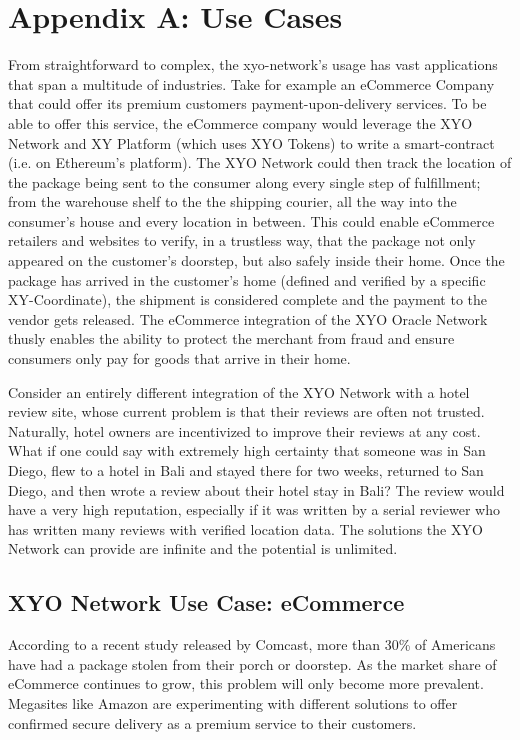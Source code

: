 \documentclass{article}
\begin{document}
\section{Appendix A: Use Cases}
From straightforward to complex, the \Gls{xyo-network}'s usage  has vast applications that span a multitude of industries. Take for example an eCommerce Company that could offer its premium customers payment-upon-delivery services. To be able to offer this service, the eCommerce company would leverage the XYO Network and XY Platform (which uses XYO Tokens) to write a \gls{smart-contract} (i.e. on Ethereum's platform). The XYO Network could then track the location of the package being sent to the consumer along every single step of fulfillment; from the warehouse shelf to the the shipping courier, all the way into the consumer's house and every location in between. This could enable eCommerce retailers and websites to verify, in a trustless way, that the package not only appeared on the customer's doorstep, but also safely inside their home. Once the package has arrived in the customer's home (defined and verified by a specific XY-Coordinate), the shipment is considered complete and the payment to the vendor gets released. The eCommerce integration of the XYO Oracle Network thusly enables the ability to protect the merchant from fraud and ensure consumers only pay for goods that arrive in their home.

Consider an entirely different integration of the XYO Network with a hotel review site, whose current problem is that their reviews are often not trusted. Naturally, hotel owners are incentivized to improve their reviews at any cost. What if one could say with extremely high \gls{certainty} that someone was in San Diego, flew to a hotel in Bali and stayed there for two weeks, returned to San Diego, and then wrote a review about their hotel stay in Bali? The review would have a very high reputation, especially if it was written by a serial reviewer who has written many reviews with verified location data. The solutions the XYO Network can provide are infinite and the potential is unlimited.

\subsection{XYO Network Use Case: eCommerce}
According to a recent study released by Comcast, more than 30\% of Americans have had a package stolen from their porch or doorstep. As the market share of eCommerce continues to grow, this problem will only become more prevalent. Megasites like Amazon are experimenting with different solutions to offer confirmed secure delivery as a premium service to their customers. 
\end{document}
